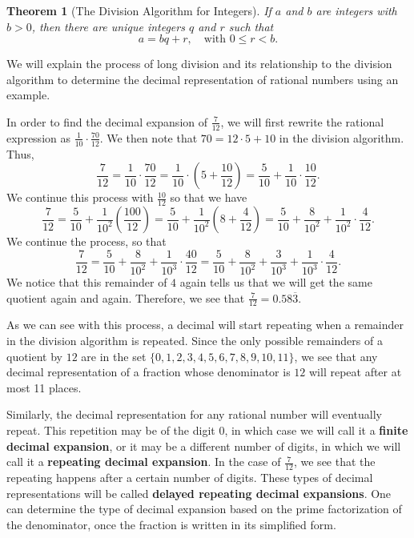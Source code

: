 \documentclass[
]{book}
\newtheorem{theorem}{Theorem}[chapter]
\theoremstyle{definition}
\theoremstyle{definition}
\theoremstyle{definition}
\theoremstyle{definition}
\theoremstyle{remark}
\begin{document}
\begin{theorem}[The Division Algorithm for Integers]
If \(a\) and \(b\) are integers with \(b>0\), then there are unique integers \(q\) and \(r\) such that \[a=bq+r, \quad \mbox{with } 0\leq r <b.\]
\end{theorem}

We will explain the process of long division and its relationship to the division algorithm to determine the decimal representation of rational numbers using an example.

In order to find the decimal expansion of \(\frac{7}{12}\), we will first rewrite the rational expression as \(\frac{1}{10} \cdot \frac{70}{12}\). We then note that \(70=12\cdot 5 + 10\) in the division algorithm. Thus,
\[\frac{7}{12} = \frac{1}{10} \cdot \frac{70}{12} = \frac{1}{10} \cdot \left( 5 + \frac{10}{12}\right)= \frac{5}{10} + \frac{1}{10} \cdot \frac{10}{12}.\] We continue this process with \(\frac{10}{12}\) so that we have \[\frac{7}{12}= \frac{5}{10} + \frac{1}{10^2} \left(\frac{100}{12}\right) = \frac{5}{10} + \frac{1}{10^2} \left(8 + \frac{4}{12}\right)= \frac{5}{10} + \frac{8}{10^2} + \frac{1}{10^2} \cdot \frac{4}{12}.\] We continue the process, so that \[\frac{7}{12} = \frac{5}{10} + \frac{8}{10^2} + \frac{1}{10^3} \cdot \frac{40}{12} = \frac{5}{10} + \frac{8}{10^2} + \frac{3}{10^3} + \frac{1}{10^3} \cdot \frac{4}{12}.\] We notice that this remainder of \(4\) again tells us that we will get the same quotient again and again. Therefore, we see that
\(\frac{7}{12} = 0.58\overline{3}\).

As we can see with this process, a decimal will start repeating when a remainder in the division algorithm is repeated. Since the only possible remainders of a quotient by \(12\) are in the set \(\{0,1,2,3,4,5,6,7,8,9,10,11\}\), we see that any decimal representation of a fraction whose denominator is \(12\) will repeat after at most 11 places.

Similarly, the decimal representation for any rational number will eventually repeat. This repetition may be of the digit \(0\), in which case we will call it a \textbf{finite decimal expansion}, or it may be a different number of digits, in which we will call it a \textbf{repeating decimal expansion}. In the case of \(\frac{7}{12}\), we see that the repeating happens after a certain number of digits. These types of decimal representations will be called \textbf{delayed repeating decimal expansions}. One can determine the type of decimal expansion based on the prime factorization of the denominator, once the fraction is written in its simplified form.
\end{document}
